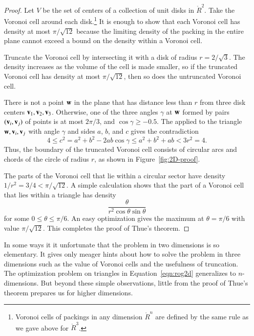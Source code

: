 \figOCULYIA %

\begin{proof}
Let $V$ be the set of centers of a collection of unit disks in
$\ring{R}^2$.  Take the Voronoi cell around each
disk.\footnote{Voronoi cells of packings in any dimension $\ring{R}^n$
  are defined by the same rule as we gave above for $\ring{R}^3$.}   It
is enough to show that each Voronoi cell has density at most
$\pi/\sqrt{12}$ because the limiting density of the packing in the entire plane cannot exceed
a bound on the density within a Voronoi cell.  


Truncate the Voronoi cell by intersecting it with a disk of radius
$r=2/\sqrt3$.   The density increases as the volume of the cell is made smaller,
so if the truncated Voronoi cell
has density at most $\pi/\sqrt{12}$, then so does the untruncated Voronoi cell.

There is not a point ${\mathbf w}$ in the plane that has distance  less than $r$
from three disk centers ${\mathbf v}_1,{\mathbf v}_2,{\mathbf v}_3$.  Otherwise, one of the three
angles $\gamma$ at ${\mathbf w}$ formed by pairs $({\mathbf v}_i,{\mathbf v}_j)$ of points
 is at most $2\pi/3$, and $\cos\gamma\ge -0.5$.
The  applied to the triangle ${\mathbf w},{\mathbf v}_i,{\mathbf v}_j$ with angle
$\gamma$ and sides $a$, $b$, and $c$ gives the contradiction
   \[ 
   4 \le c^2 = a^2 + b^2 - 2 a b \cos\gamma 
   \le a^2 + b^2 + a b < 3r^2 = 4.
   \] 
Thus, the boundary of the truncated Voronoi cell consists of circular
arcs and chords of the circle of radius $r$, as shown in Figure~\ref{fig:2D-proof}.

\figSENQMWT %

The parts of the Voronoi cell that lie within a circular sector have
density $1/r^2 = 3/4 < \pi/\sqrt{12}$.  A simple calculation shows
that the part of a Voronoi cell that lies within a triangle has
density
   \begin{equation}\label{eqn:rog2d}
   \frac{\theta}{r^2 \cos\theta\sin\theta}
   \end{equation}
for some $0 \le \theta\le \pi/6$.  An easy optimization gives the maximum
at $\theta=\pi/6$ with value $\pi/\sqrt{12}$.  This completes the proof of Thue's theorem.
\end{proof}

In some ways it it unfortunate that the problem in two dimensions is
so elementary.  It gives only meager hints about how to solve the problem
in three dimensions such as the value of Voronoi cells
and the usefulness of truncation.  The optimization problem on
triangles in Equation~\ref{eqn:rog2d} generalizes to $n$-dimensions.
But beyond these simple observations,  little from the proof of Thue's
theorem prepares us for higher dimensions.

